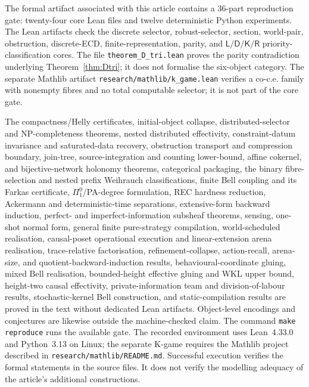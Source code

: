 \documentclass[11pt]{article}
\theoremstyle{plain}
\theoremstyle{definition}
\theoremstyle{remark}
\begin{document}
The formal artifact associated with this article contains a 36-part reproduction
gate: twenty-four core Lean files and twelve deterministic Python experiments. The Lean artifacts check the
discrete selector, robust-selector, section, world-pair, obstruction,
discrete-ECD, finite-representation, parity, and $\mathsf L/\mathsf D/\mathsf K/\mathsf R$ priority-classification cores.
The file \texttt{theorem\_D\_tri.lean} proves the parity contradiction underlying
Theorem~\ref{thm:Dtri}; it does not formalise the six-object category. The
separate Mathlib artifact \texttt{research/mathlib/k\_game.lean} verifies a
co-c.e. family with nonempty fibres and no total computable selector; it is not
part of the core gate.

The compactness/Helly certificates, initial-object collapse, distributed-selector
and NP-completeness theorems, nested distributed effectivity,
constraint-datum invariance and saturated-data recovery, obstruction transport
and compression boundary, join-tree, source-integration and counting lower-bound, affine cokernel, and
bijective-network holonomy theorems, categorical packaging, the binary
fibre-selection and nested prefix Weihrauch classifications, finite Bell
coupling and its Farkas certificate, $\Pi^0_1$/PA-degree formulation, REC
hardness reduction, Ackermann and deterministic-time separations,
extensive-form backward induction, perfect- and imperfect-information subsheaf
theorems, sensing, one-shot normal form, general finite pure-strategy
compilation, world-scheduled realisation, causal-poset operational execution and
linear-extension arena realisation, trace-relative factorisation, refinement-collapse, action-recall, arena-size,
and quotient-backward-induction results,
behavioural-coordinate gluing, mixed Bell realisation, bounded-height effective
gluing and WKL upper bound, height-two causal effectivity,
private-information team and division-of-labour
results, stochastic-kernel Bell construction, and static-compilation results are
proved in the text without dedicated Lean artifacts. Object-level
encodings and conjectures are likewise outside the machine-checked claim. The
command \texttt{make reproduce} runs the available gate. The recorded environment
uses Lean~4.33.0 and Python~3.13 on Linux; the separate K-game requires the
Mathlib project described in \texttt{research/mathlib/README.md}. Successful execution verifies the formal statements in the source files. It
does not verify the modelling adequacy of the article's additional
constructions.
\end{document}
